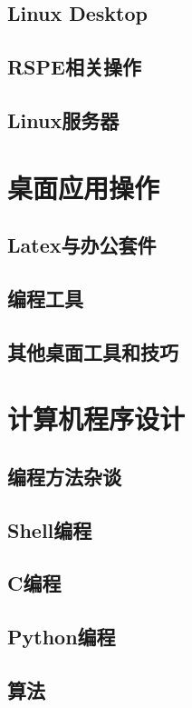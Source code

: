 \documentclass[11pt,a4paper]{report}
\begin{document}
\chapter{Linux Desktop}

\chapter{RSPE相关操作}

\chapter{Linux服务器}


\part{桌面应用操作}

\chapter{Latex与办公套件}

\chapter{编程工具}

\chapter{其他桌面工具和技巧}


\part{计算机程序设计}
\chapter{编程方法杂谈}

\chapter{Shell编程}

\chapter{C编程}

\chapter{Python编程}

\chapter{算法}

\end{document}
